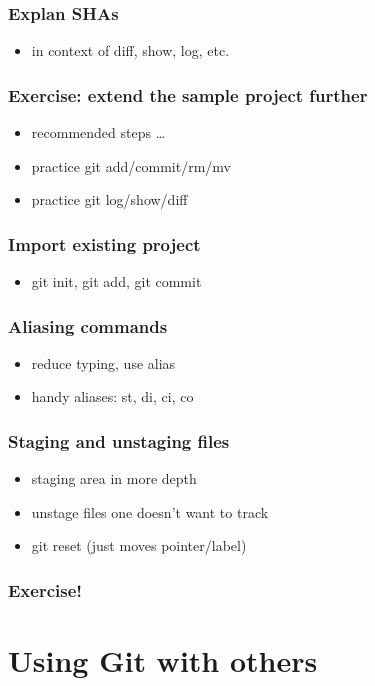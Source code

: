 \documentclass{git_course}
\begin{document}
\begin{frame}
\frametitle{Explan SHAs}
\begin{itemize}
    \item in context of diff, show, log, etc.
\end{itemize}
\end{frame}

\begin{frame}
\frametitle{Exercise: extend the sample project further}
\begin{itemize}
    \item recommended steps \ldots
    \item practice git add/commit/rm/mv
    \item practice git log/show/diff
\end{itemize}
\end{frame}

\begin{frame}
\frametitle{Import existing project}
\begin{itemize}
    \item git init, git add, git commit
\end{itemize}
\end{frame}

\begin{frame}
\frametitle{Aliasing commands}
\begin{itemize}
    \item reduce typing, use alias
    \item handy aliases: st, di, ci, co
\end{itemize}
\end{frame}

\begin{frame}
\frametitle{Staging and unstaging files}
\begin{itemize}
    \item staging area in more depth
    \item unstage files one doesn't want to track
    \item git reset (just moves pointer/label)
\end{itemize}
\end{frame}

\begin{frame}
\frametitle{Exercise!}
\end{frame}

\section{Using Git with others}
\end{document}
